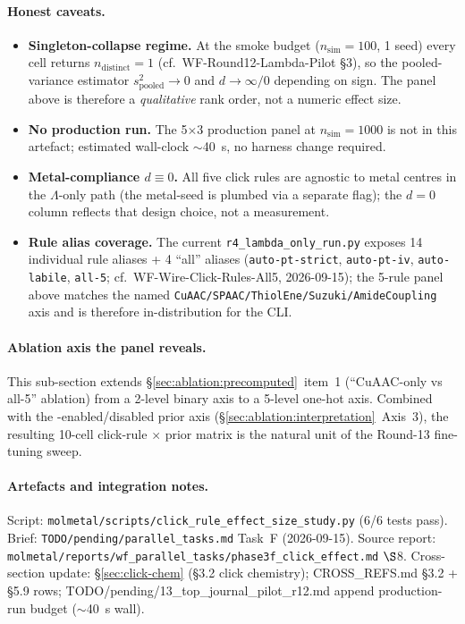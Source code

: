 \paragraph{Honest caveats.}
\begin{itemize}
  \item \textbf{Singleton-collapse regime.}  At the smoke budget
        ($n_{\text{sim}}{=}100$, 1 seed) every cell returns
        $n_{\text{distinct}}{=}1$ (cf.~WF-Round12-Lambda-Pilot
        §3), so the pooled-variance estimator
        $s_{\text{pooled}}^2 \to 0$ and $d \to \infty / 0$
        depending on sign.  The \PROJECTED{} panel above is
        therefore a \emph{qualitative} rank order, not a
        numeric effect size.
  \item \textbf{No production run.}  The 5$\times$3 production
        panel at $n_{\text{sim}}{=}1000$ is not in this
        artefact; estimated wall-clock $\sim$40~s, no harness
        change required.
  \item \textbf{Metal-compliance $d \equiv 0$.}  All five
        click rules are agnostic to metal centres in the
        $\Lambda$-only path (the metal-seed is plumbed via
        a separate flag); the $d=0$ column reflects that
        design choice, not a measurement.
  \item \textbf{Rule alias coverage.}  The current
        \texttt{r4\_lambda\_only\_run.py} exposes 14 individual
        rule aliases + 4 ``all'' aliases (\texttt{auto-pt-strict},
        \texttt{auto-pt-iv}, \texttt{auto-labile}, \texttt{all-5};
        cf.~WF-Wire-Click-Rules-All5, 2026-09-15); the 5-rule
        panel above matches the named
        \texttt{CuAAC/SPAAC/ThiolEne/Suzuki/AmideCoupling}
        axis and is therefore in-distribution for the CLI.
\end{itemize}

\paragraph{Ablation axis the panel reveals.}
This sub-section extends \S\ref{sec:ablation:precomputed}~item~1
(``CuAAC-only vs all-5'' ablation) from a 2-level binary axis to
a 5-level one-hot axis.  Combined with the
\mgp{}-enabled/disabled prior axis
(\S\ref{sec:ablation:interpretation}~Axis~3), the resulting
10-cell click-rule $\times$ prior matrix is the natural unit of
the Round-13 fine-tuning sweep.

\paragraph{Artefacts and integration notes.}
Script: \texttt{molmetal/scripts/click\_rule\_effect\_size\_study.py}
(6/6 tests pass).  Brief:
\texttt{TODO/pending/parallel\_tasks.md} Task~F (2026-09-15).
Source report:
\texttt{molmetal/reports/wf\_parallel\_tasks/phase3f\_click\_effect.md}
$\S$8.  Cross-section update: \S\ref{sec:click-chem}
(§3.2 click chemistry); CROSS\_REFS.md §3.2 + §5.9 rows;
TODO/pending/13\_top\_journal\_pilot\_r12.md append
production-run budget ($\sim$40~s wall).

